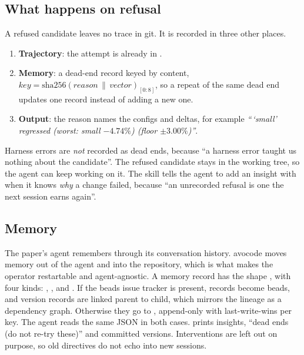 \subsection{What happens on refusal}
\label{sec:refusal}

A refused candidate leaves no trace in git. It is recorded in three other places.
\begin{enumerate}[leftmargin=*,itemsep=1pt]
  \item \textbf{Trajectory}: the attempt is already in .
  \item \textbf{Memory}: a dead-end record keyed by content,
    $\mathit{key} = \mathrm{sha256}(\mathit{reason} \,\|\, \mathit{vector})_{[0:8]}$, so a repeat of
    the same dead end updates one record instead of adding a new one.
  \item \textbf{Output}: the reason names the configs and deltas, for example \emph{``\,`small'
    regressed (worst: small $-4.74\%$) (floor $\pm 3.00\%$)''}.
\end{enumerate}
Harness errors are \emph{not} recorded as dead ends, because ``a harness error taught us nothing
about the candidate''. The refused candidate stays in the working tree, so the agent can keep
working on it. The skill tells the agent to add an insight with  when it knows
\emph{why} a change failed, because ``an unrecorded refusal is one the next session earns again''.

\subsection{Memory}

The paper's agent remembers through its conversation history. avocode moves memory out of the agent
and into the repository, which is what makes the operator restartable and agent-agnostic. A memory
record has the shape , with four kinds:
, ,  and . If the beads issue tracker
\citep{yegge2025beads} is present, records become beads, and version records are linked parent to
child, which mirrors the lineage as a dependency graph. Otherwise they go to
, append-only with last-write-wins per key. The agent reads the same JSON
in both cases.  prints insights, ``dead ends (do not re-try these)'' and committed
versions. Interventions are left out on purpose, so old directives do not echo into new sessions.

